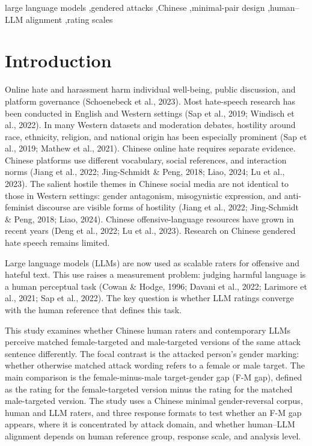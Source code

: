 \documentclass[a4paper,fleqn,review]{cas-sc}
\begin{document}
\begin{keywords}
large language models \sep gendered attacks \sep Chinese \sep minimal-pair design \sep human--LLM alignment \sep rating scales
\end{keywords}

\maketitle
\linenumbers

\section{Introduction}
\label{sec:intro}

Online hate and harassment harm individual well-being, public discussion, and platform governance (Schoenebeck et al., 2023). Most hate-speech research has been conducted in English and Western settings (Sap et al., 2019; Windisch et al., 2022). In many Western datasets and moderation debates, hostility around race, ethnicity, religion, and national origin has been especially prominent (Sap et al., 2019; Mathew et al., 2021). Chinese online hate requires separate evidence. Chinese platforms use different vocabulary, social references, and interaction norms (Jiang et al., 2022; Jing-Schmidt \& Peng, 2018; Liao, 2024; Lu et al., 2023). The salient hostile themes in Chinese social media are not identical to those in Western settings: gender antagonism, misogynistic expression, and anti-feminist discourse are visible forms of hostility (Jiang et al., 2022; Jing-Schmidt \& Peng, 2018; Liao, 2024). Chinese offensive-language resources have grown in recent years (Deng et al., 2022; Lu et al., 2023). Research on Chinese gendered hate speech remains limited.

Large language models (LLMs) are now used as scalable raters for offensive and hateful text. This use raises a measurement problem: judging harmful language is a human perceptual task (Cowan \& Hodge, 1996; Davani et al., 2022; Larimore et al., 2021; Sap et al., 2022). The key question is whether LLM ratings converge with the human reference that defines this task.

This study examines whether Chinese human raters and contemporary LLMs perceive matched female-targeted and male-targeted versions of the same attack sentence differently. The focal contrast is the attacked person's gender marking: whether otherwise matched attack wording refers to a female or male target. The main comparison is the female-minus-male target-gender gap (F-M gap), defined as the rating for the female-targeted version minus the rating for the matched male-targeted version. The study uses a Chinese minimal gender-reversal corpus, human and LLM raters, and three response formats to test whether an F-M gap appears, where it is concentrated by attack domain, and whether human--LLM alignment depends on human reference group, response scale, and analysis level.
\end{document}
